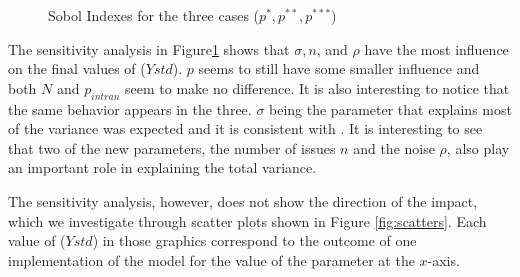 \documentclass{article}
\begin{document}
\begin{figure}[H]
\begin{subfigure}[b]{0.5\textwidth}
     \end{subfigure}
     \caption{Sobol Indexes for the three cases (\(p^{*}, p^{**}, p^{***}\))}
     \label{fig:sobol} 
    \end{figure}

    The sensitivity analysis in Figure\ref{fig:sobol} shows that \(\sigma, n \),
    and \(\rho\) have the most influence on the final values of (\(Ystd\)). $p$
    seems to still have some smaller influence and both $N$ and $p_{intran}$
    seem to make no difference. It is also interesting to notice that the same
    behavior appears in the three. \(\sigma\) being the parameter that explains
    most of the variance was expected and it is consistent with
    \citep{martins12b}. It is interesting to see that two of the new parameters,
    the number of issues $n$ and the noise \(\rho\), also play an important role
    in explaining the total variance.
     
    The
    sensitivity analysis, however, does not show the direction of the impact,
    which we investigate through scatter plots shown in Figure \ref{fig:scatters}. Each value of (\(Ystd\)) in those graphics correspond
    to the outcome of one implementation of the model for the value of the parameter at the $x$-axis.
\end{document}
